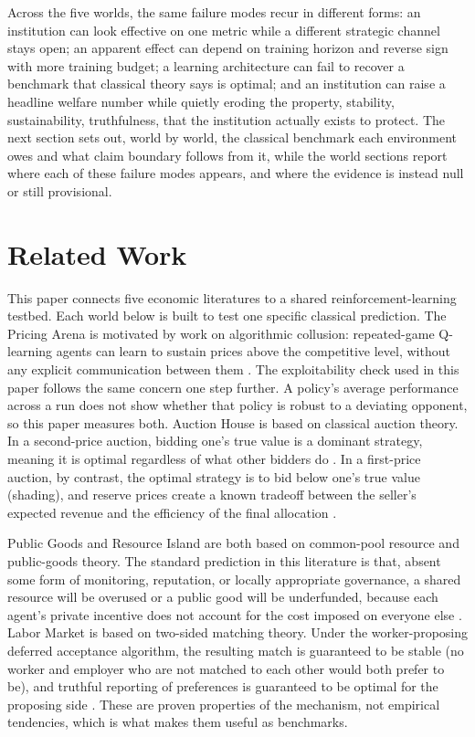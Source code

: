 \documentclass[11pt]{article}
\begin{document}
Across the five worlds, the same failure modes recur in different forms: an
institution can look effective on one metric while a different strategic channel
stays open; an apparent effect can depend on training horizon and reverse sign with more training budget; a learning architecture can fail to recover a
benchmark that classical theory says is optimal; and an institution can raise a
headline welfare number while quietly eroding the property, stability,
sustainability, truthfulness, that the institution actually exists to protect. The next section sets out, world by
world, the classical benchmark each environment owes and what claim boundary
follows from it, while the world sections report where each of these failure modes appears, and where
the evidence is instead null or still provisional. 

\section{Related Work}

This paper connects five economic literatures to a shared reinforcement-learning testbed. Each world below is built to test one specific classical prediction. The Pricing Arena is motivated by work on algorithmic collusion: repeated-game Q-learning agents can learn to sustain prices above the competitive level, without any explicit communication between them \citep{calvano2020,calvano2021}. The exploitability check used in this paper follows the same concern one step further. A policy's average performance across a run does not show whether that policy is robust to a deviating opponent, so this paper measures both. Auction House is based on classical auction theory. In a second-price auction, bidding one's true value is a dominant strategy, meaning it is optimal regardless of what other bidders do \citep{vickrey1961}. In a first-price auction, by contrast, the optimal strategy is to bid below one's true value (shading), and reserve prices create a known tradeoff between the seller's expected revenue and the efficiency of the final allocation \citep{myerson1981,milgrom2004}.

Public Goods and Resource Island are both based on common-pool resource and public-goods theory. The standard prediction in this literature is that, absent some form of monitoring, reputation, or locally appropriate governance, a shared resource will be overused or a public good will be underfunded, because each agent's private incentive does not account for the cost imposed on everyone else \citep{samuelson1954,ostrom1990}. Labor Market is based on two-sided matching theory. Under the worker-proposing deferred acceptance algorithm, the resulting match is guaranteed to be stable (no worker and employer who are not matched to each other would both prefer to be), and truthful reporting of preferences is guaranteed to be optimal for the proposing side \citep{galeshapley1962,rothsotomayor1990,roth1984}. These are proven properties of the mechanism, not empirical tendencies, which is what makes them useful as benchmarks.
\end{document}
